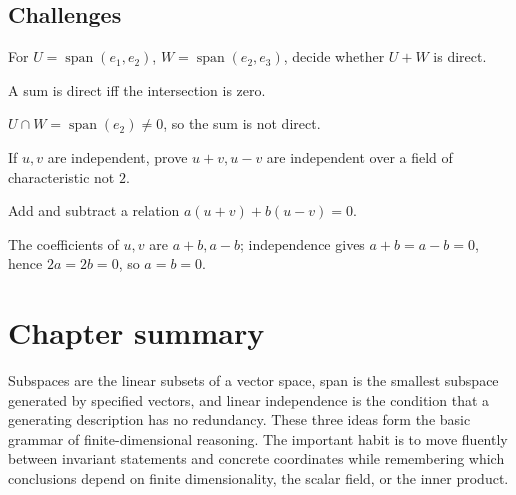 \subsection*{Challenges}

\begin{exercise}\label{exr:i02-expand-15}
For \(U=\operatorname{span}(e_1,e_2)\), \(W=\operatorname{span}(e_2,e_3)\), decide whether \(U+W\) is direct.
\end{exercise}
\begin{hint}
A sum is direct iff the intersection is zero.
\end{hint}
\begin{solution}
\(U\cap W=\operatorname{span}(e_2)\neq0\), so the sum is not direct.
\end{solution}

\begin{exercise}\label{exr:i02-expand-16}
If \(u,v\) are independent, prove \(u+v,u-v\) are independent over a field of characteristic not \(2\).
\end{exercise}
\begin{hint}
Add and subtract a relation \(a(u+v)+b(u-v)=0\).
\end{hint}
\begin{solution}
The coefficients of \(u,v\) are \(a+b,a-b\); independence gives \(a+b=a-b=0\), hence \(2a=2b=0\), so \(a=b=0\).
\end{solution}
\section*{Chapter summary}
Subspaces are the linear subsets of a vector space, span is the smallest subspace generated by specified vectors, and linear independence is the condition that a generating description has no redundancy. These three ideas form the basic grammar of finite-dimensional reasoning.
The important habit is to move fluently between invariant statements and concrete coordinates while remembering which conclusions depend on finite dimensionality, the scalar field, or the inner product.
